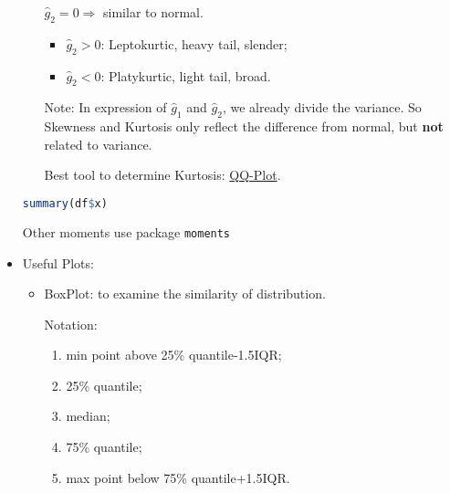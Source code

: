 \begin{itemize}[topsep=2pt,itemsep=2pt]
\begin{itemize}[topsep=2pt,itemsep=2pt]
            $ \hat{g}_2=0 \Rightarrow $ similar to normal.
            \begin{itemize}[topsep=2pt,itemsep=2pt]
                \item $ \hat{g}_2>0 $: Leptokurtic, heavy tail, slender;
                \item $ \hat{g}_2<0 $: Platykurtic, light tail, broad.
            \end{itemize}
            
            Note: In expression of $ \hat{g}_1 $ and $ \hat{g}_2 $, we already divide the variance. So Skewness and Kurtosis only reflect the difference from normal, but \textbf{not}  related to variance.
                
            Best tool to determine Kurtosis: \hyperlink{QQplot}{QQ-Plot}.
            
        \end{itemize}

\begin{rcode}
\begin{lstlisting}[language=R]
summary(df$x)
\end{lstlisting}

    Other moments use package \lstinline|moments|
\end{rcode}
        \item Useful Plots:
        \begin{itemize}[topsep=2pt,itemsep=2pt]
            \item BoxPlot: to examine the similarity of  distribution.
            
            Notation:
            \begin{enumerate}[topsep=2pt,itemsep=2pt]
                \item min point above 25\% quantile-1.5IQR;
                \item 25\% quantile;
                \item median;
                \item 75\% quantile;
                \item max point below 75\% quantile+1.5IQR.
            \end{enumerate}
            
                
            \begin{center}
            \end{center}



\end{itemize}
\end{itemize}
